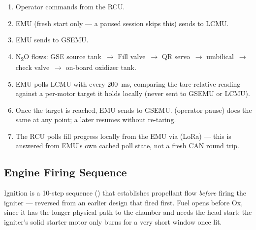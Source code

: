 \documentclass[11pt,letterpaper]{article}
\begin{document}
\begin{enumerate}[nosep]
  \item Operator commands  from the RCU.
  \item EMU (fresh start only --- a paused session skips this) sends
         to LCMU.
  \item EMU sends  to GSEMU.
  \item N\textsubscript{2}O flows: GSE source tank~$\to$ Fill valve~$\to$
        QR servo~$\to$ umbilical~$\to$ check valve~$\to$ on-board
        oxidizer tank.
  \item EMU polls LCMU with  every
        200~ms, comparing the tare-relative reading against a per-motor
        target it holds locally (never sent to GSEMU or LCMU).
  \item Once the target is reached, EMU sends 
        to GSEMU.  (operator pause) does the same at any
        point; a later  resumes without re-taring.
  \item The RCU polls fill progress locally from the EMU via
         (LoRa) --- this is answered from EMU's
        own cached poll state, not a fresh CAN round trip.
\end{enumerate}

\subsection{Engine Firing Sequence}

Ignition is a 10-step sequence () that
establishes propellant flow \emph{before} firing the igniter --- reversed
from an earlier design that fired first. Fuel opens before Ox, since it
has the longer physical path to the chamber and needs the head start;
the igniter's solid starter motor only burns for a very short window
once lit.
\end{document}
